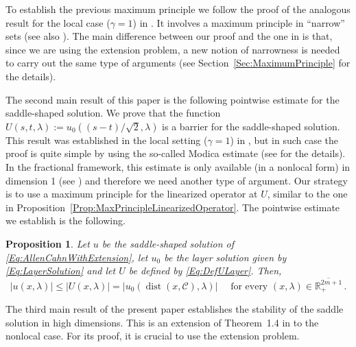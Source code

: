 \documentclass[12pt,reqno]{amsart}
\newtheorem{proposition}[theorem]{Proposition}
\theoremstyle{definition}
\theoremstyle{remark}
\newcommand{\con}[1]{\mathbb{#1}}
\newcommand{\R}{\con{R}} %
\newcommand{\ccal}{\mathscr{C}}
\newcommand{\s}{\gamma}
\DeclareMathOperator{\dist}{dist}
\numberwithin{equation}{section}
\begin{document}
To establish the previous maximum principle we follow the proof of the analogous result for the local case ($\s = 1$) in \cite{Cabre-Saddle}. It involves a maximum principle in ``narrow'' sets (see also \cite{Cabre-Topics,BerestyckiNirembergVaradhan}). The main difference between our proof and the one in \cite{Cabre-Saddle} is that, since we are using the extension problem, a new notion of narrowness is needed to carry out the same type of arguments (see Section~\ref{Sec:MaximumPrinciple} for the details).




The second main result of this paper is the following pointwise estimate for the saddle-shaped solution. We prove that the function $U(s,t,\lambda) := u_0 ( (s-t)/\sqrt{2}, \lambda)$ is a barrier for the saddle-shaped solution. This result was established in the local setting ($\s = 1$) in \cite{CabreTerraI}, but in such case the proof is quite simple by using the so-called Modica estimate (see \cite{CabreTerraI} for the details). In the fractional framework, this estimate is only available (in a nonlocal form) in dimension 1 (see \cite{CabreSolaMorales, CabreSireI}) and therefore we need another type of argument. Our strategy is to use a maximum principle for the linearized operator at $U$, similar to the one in Proposition~\ref{Prop:MaxPrincipleLinearizedOperator}. The pointwise estimate we establish is the following.

\begin{proposition}
	\label{Prop:SaddleUnderLayer}
	Let $u$ be the saddle-shaped solution of \eqref{Eq:AllenCahnWithExtension},  let $u_0$ be the layer solution given by \eqref{Eq:LayerSolution} and let $U$ be defined by \eqref{Eq:DefULayer}. Then, 
	\begin{equation}
	\label{Eq:SaddleUnderLayer}
	|u(x,\lambda)| \leq |U(x,\lambda)| = |u_0 ( \dist(x, \ccal), \lambda) | \quad \text{ for every } (x,\lambda)\in \overline{\R^{2m+1}_+}\,.
	\end{equation}
\end{proposition}



The third main result of the present paper establishes the stability of the saddle solution in high dimensions. This is an extension of Theorem~1.4 in \cite{Cabre-Saddle} to the nonlocal case. For its proof, it is crucial to use the extension problem.
\end{document}
